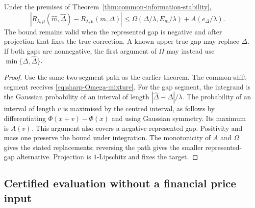 \begin{corollary}
\label{cor:sharp-finite-path}
Under the premises of Theorem~\ref{thm:common-information-stability},
\begin{equation}
 |R_{\lambda,\mu}(\widehat m,\widehat\Delta)
                        -R_{\lambda,\mu}(m,\Delta)|
 \leq\Omega(\Delta/\lambda,E_m/\lambda)
                       +A(e_\Delta/\lambda).
 \label{eq:sharp-finite-path}
\end{equation}
The bound remains valid when the represented gap is negative and after
projection that fixes the true correction. A known upper true gap may
replace $\Delta$. If both gaps are nonnegative, the first argument of
$\Omega$ may instead use $\min\{\Delta,\widehat\Delta\}$.
\end{corollary}
\begin{proof}
Use the same two-segment path as the earlier theorem. The common-shift
segment receives \eqref{eq:sharp-Omega-mixture}. For the gap segment,
the integrand is the Gaussian probability of an interval of length
$|\widehat\Delta-\Delta|/\lambda$. The probability of an interval
of length $v$ is maximised by the centred interval, as follows by
differentiating $\Phi(x+v)-\Phi(x)$ and using Gaussian symmetry.
Its maximum is $A(v)$. This argument also covers a negative represented
gap. Positivity and mass one preserve the bound under integration.
The monotonicity of $A$ and $\Omega$ gives the stated replacements;
reversing the path gives the smaller represented-gap alternative.
Projection is $1$-Lipschitz and fixes the target.
\end{proof}

\subsection{Certified evaluation without a financial price input}

